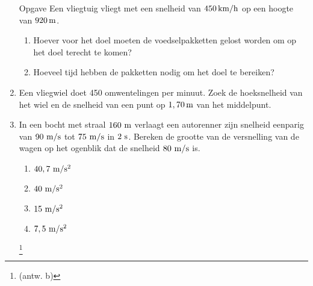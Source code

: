 \documentclass{ximera}
\begin{document}
\begin{enumerate}
\item[Opgave] Een vliegtuig vliegt met een snelheid van $450\rm\,km/h$ op een hoogte van $920\rm\,m$.
\begin{enumerate}
\item Hoever voor het doel moeten de voedselpakketten gelost worden om op het doel terecht te komen?
\item Hoeveel tijd hebben de pakketten nodig om het doel te bereiken?
\end{enumerate}









\item Een vliegwiel doet 450 omwentelingen per minuut. Zoek de hoeksnelheid van het wiel en de snelheid van een punt op $1,70\rm\,m$ van het middelpunt.

\item In een bocht met straal $160~\rm m$ verlaagt een autorenner
zijn snelheid eenparig van $90~\rm m/s$ tot $75~\rm m/s$ in $2~\rm
s$. Bereken de grootte van de versnelling van de wagen op het
ogenblik dat de snelheid $80~\rm m/s$ is.
\begin{enumerate}
\item $40,7~\rm m/s^2$
\item $40~\rm m/s^2$
\item $15~\rm m/s^2$
\item $7,5~\rm m/s^2$
\end{enumerate}
\footnote{(antw. b)}


\end{enumerate}
\end{document}
